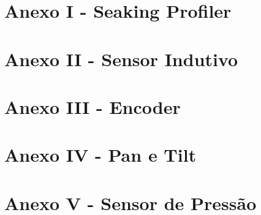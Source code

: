 \appendix
\section{Anexo I - Seaking Profiler} 
\label{seaking_profiler} 




\appendix
\section{Anexo II - Sensor Indutivo} 
\label{datasheet_indutivo} 




\appendix
\section{Anexo III - Encoder} 
\label{datasheet_encoder} 



\appendix
\section{Anexo IV - Pan e Tilt} 
\label{datasheet_pantilt} 




\appendix
\section{Anexo V - Sensor de Pressão} 
\label{datasheet_pressao} 
